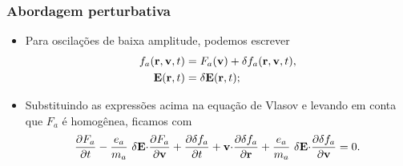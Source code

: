 \documentclass[10pt,aspectratio=1610,lualatex]{beamer}
\begin{document}

\begin{frame}
  \frametitle{Abordagem perturbativa}
  \begin{itemize}
    \item Para oscilações de baixa amplitude, podemos escrever
    \begin{equation*}
      \begin{split}
	f_a({\bf r}, {\bf v},t)&=F_a({\bf v})
	+\delta f_a({\bf r}, {\bf v},t),\\
      {\bf E}({\bf r},t)&=\delta {\bf E}({\bf r},t);
    \end{split}
    \end{equation*}
    \vspace{0.2cm}
    \pause
    \item Substituindo as expressões acima na equação de Vlasov
    e levando em conta que $F_a$ é homogênea, ficamos com
    \begin{equation}
      \frac{\partial F_a}{\partial t}-\frac{e_a}{m_a}\
      \delta {\bf E \cdot} \frac{\partial F_a}{\partial \bf v}
      +\frac{\partial \delta f_a}{\partial t}+{\bf v \cdot}
      \frac{\partial \delta f_a}{\partial {\bf r}}
      +\frac{e_a}{m_a}\ \delta {\bf E \cdot}
      \frac{\partial \delta f_a}{\partial \bf v}=0.
      \label{turb_ave_vlasov}
    \end{equation}
  \end{itemize}
\end{frame}
\end{document}
